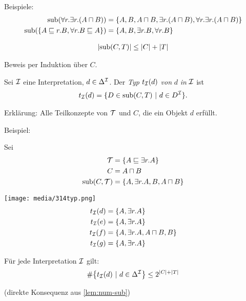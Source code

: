 \begin{tafel}
Beispiele:
\begin{align*}
    \operatorname{sub}(\forall r.\exists r.(A \sqcap B)) &= \{A,B,A \sqcap B, \exists r.(A \sqcap B), \forall r.\exists r.(A \sqcap B)\}\\
    \operatorname{sub}(\{A \sqsubseteq r.B, \forall r.B \sqsubseteq A\}) &= \{A,B, \exists r.B, \forall r.B\}
\end{align*}
\end{tafel}

\begin{lemma}
    \label{lem:num-sub}
    \begin{align*}
\left| \sub\left( C,T \right) \right| \leq \left| C \right| + \left| T \right|
\end{align*}
\end{lemma}
Beweis per Induktion über $C$.

\begin{definition}
Sei $\mathcal{I}$ eine Interpretation, $d \in \Delta^{\mathcal{I}}$. Der \emph{Typ}
$t_\MI\left( d \right)$ \emph{von} $d$ \emph{in} $\mathcal{I}$ ist
\begin{align*}
t_\MI\left( d \right) = \left\{ D \in \sub\left( C,T \right)\  \right|\ d \in D^\MI\}.
\end{align*}
\end{definition}
Erklärung: Alle Teilkonzepte von $\mathcal{T}$ und $C$, die ein Objekt $d$
erfüllt.

\begin{tafel}\label{t:typen}
Beispiel:

Sei
\begin{align*}
    \mathcal{T} &=\{A \sqsubseteq \exists r.A\}\\
    C &= A \sqcap B\\
    \operatorname{sub}(C,\mathcal{T}) &= \{A, \exists r.A, B, A \sqcap B\}
\end{align*}

\texttt{[image: media/314typ.png]}
\begin{align*}
    t_{\mathcal{I}}(d)&=\{A, \exists r.A\}\\
    t_{\mathcal{I}}(e)&=\{A, \exists r.A\}\\
    t_{\mathcal{I}}(f)&=\{A, \exists r.A, A \sqcap B, B\}\\
    t_{\mathcal{I}}(g)&=\{A, \exists r.A\}
\end{align*}
\end{tafel}

\begin{lemma}
    \label{lem:num-typ}
Für jede Interpretation $\mathcal{I}$ gilt:
\begin{align*}
\#\left\{ t_\MI\left( d \right)\ |\ d \in \Delta^\MI \right\} \leq 2^{\left| C \right| + |T|}
\end{align*}
\end{lemma}
(direkte Konsequenz aus \autoref{lem:num-sub})

